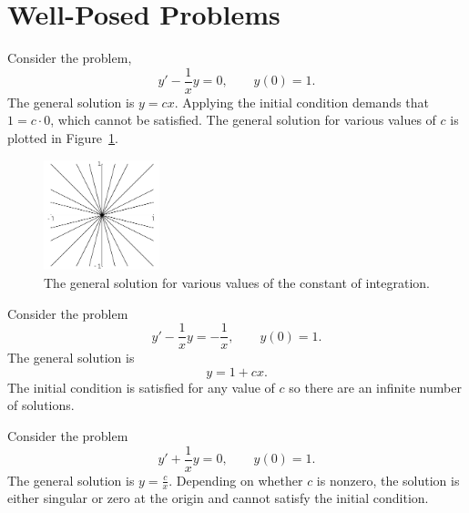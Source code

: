 \section{Well-Posed Problems}





\begin{Example}
  Consider the problem,
  \[ 
  y' - \frac{1}{x} y = 0, \qquad y(0) = 1.
  \]
  The general solution is $y = c x$.  Applying the initial condition demands that
  $1 = c \cdot 0$, which cannot be satisfied.
  The general solution for various values of $c$ is plotted in 
  Figure~\ref{cx}.

  \begin{figure}[tb!]
    \begin{center}
      \includegraphics[width=0.3\textwidth]{ode/first_order/cx}
    \end{center}
    \caption{The general solution for various values of the constant
    of integration.}
    \label{cx}
  \end{figure}

\end{Example}








\begin{Example}
  Consider the problem
  \[ 
  y' - \frac{1}{x} y = -\frac{1}{x}, \qquad y(0) = 1.
  \]
  The general solution is 
  \[ 
  y = 1 + c x.
  \]
  The initial condition is satisfied for any value of $c$ so there are an 
  infinite number of solutions.
\end{Example}






\begin{Example}
  Consider the problem
  \[ 
  y' + \frac{1}{x} y = 0, \qquad y(0) = 1.
  \]
  The general solution is $y = \frac{c}{x}$.  
  Depending on whether $c$ is nonzero, the solution is either singular or zero 
  at the origin and cannot satisfy the initial condition.
\end{Example}





